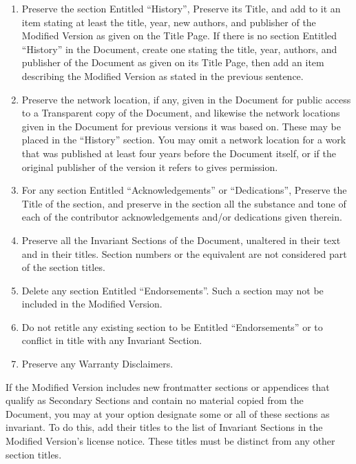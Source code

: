 \documentclass[letterpaper,10pt,english,openany,oneside]{sphinxmanual}
\begin{document}
\begin{enumerate}
\item {} 
\sphinxAtStartPar
Preserve the section Entitled “History”, Preserve its Title, and add
to it an item stating at least the title, year, new authors, and
publisher of the Modified Version as given on the Title Page. If
there is no section Entitled “History” in the Document, create one
stating the title, year, authors, and publisher of the Document as
given on its Title Page, then add an item describing the Modified
Version as stated in the previous sentence.

\item {} 
\sphinxAtStartPar
Preserve the network location, if any, given in the Document for
public access to a Transparent copy of the Document, and likewise the
network locations given in the Document for previous versions it was
based on. These may be placed in the “History” section. You may omit
a network location for a work that was published at least four years
before the Document itself, or if the original publisher of the
version it refers to gives permission.

\item {} 
\sphinxAtStartPar
For any section Entitled “Acknowledgements” or “Dedications”,
Preserve the Title of the section, and preserve in the section all
the substance and tone of each of the contributor acknowledgements
and/or dedications given therein.

\item {} 
\sphinxAtStartPar
Preserve all the Invariant Sections of the Document, unaltered in
their text and in their titles. Section numbers or the equivalent are
not considered part of the section titles.

\item {} 
\sphinxAtStartPar
Delete any section Entitled “Endorsements”. Such a section may not be
included in the Modified Version.

\item {} 
\sphinxAtStartPar
Do not retitle any existing section to be Entitled “Endorsements” or
to conflict in title with any Invariant Section.

\item {} 
\sphinxAtStartPar
Preserve any Warranty Disclaimers.

\end{enumerate}

\sphinxAtStartPar
If the Modified Version includes new front\sphinxhyphen{}matter sections or appendices
that qualify as Secondary Sections and contain no material copied from
the Document, you may at your option designate some or all of these
sections as invariant. To do this, add their titles to the list of
Invariant Sections in the Modified Version’s license notice. These
titles must be distinct from any other section titles.
\end{document}
